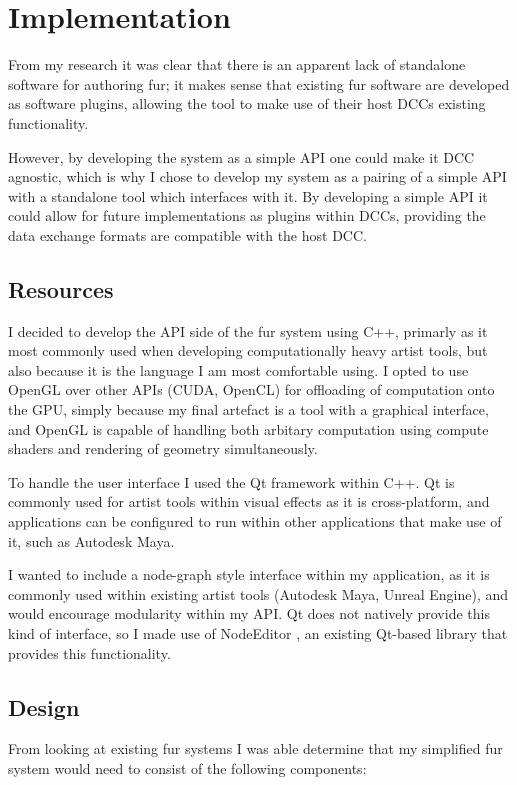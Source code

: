 \documentclass[]{acmsiggraph}
\begin{document}
\section{Implementation} \label{sec:implementation}
From my research it was clear that there is an apparent lack of standalone software for authoring fur; it makes sense that existing fur software are developed as software plugins, allowing the tool to make use of their host DCCs existing functionality.

However, by developing the system as a simple API one could make it DCC agnostic, which is why I chose to develop my system as a pairing of a simple API with a standalone tool which interfaces with it. By developing a simple API it could allow for future implementations as plugins within DCCs, providing the data exchange formats are compatible with the host DCC.

\subsection{Resources} \label{sec:resources}
I decided to develop the API side of the fur system using C++, primarly as it most commonly used when developing computationally heavy artist tools, but also because it is the language I am most comfortable using. I opted to use OpenGL over other APIs (CUDA, OpenCL) for offloading of computation onto the GPU, simply because my final artefact is a tool with a graphical interface, and OpenGL is capable of handling both arbitary computation using compute shaders and rendering of geometry simultaneously.

To handle the user interface I used the Qt framework within C++. Qt is commonly used for artist tools within visual effects as it is cross-platform, and applications can be configured to run within other applications that make use of it, such as Autodesk Maya.

I wanted to include a node-graph style interface within my application, as it is commonly used within existing artist tools (Autodesk Maya, Unreal Engine), and would encourage modularity within my API. Qt does not natively provide this kind of interface, so I made use of NodeEditor \cite{Pinaev2017}, an existing Qt-based library that provides this functionality.

\subsection{Design} \label{sec:design}
From looking at existing fur systems I was able determine that my simplified fur system would need to consist of the following components:
\end{document}
